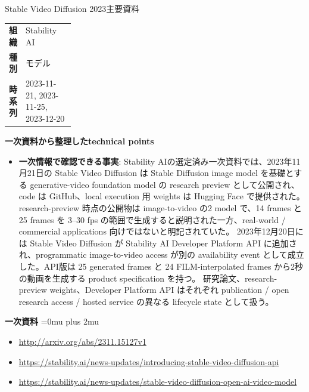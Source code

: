 \begin{technicalnote}{Stable Video Diffusion 2023}{主要資料}
\begingroup
\begin{tabularx}{\linewidth}{@{}>{\bfseries}p{0.22\linewidth}X@{}}
組織 & Stability AI \\
種別 & モデル \\
時系列 & 2023-11-21, 2023-11-25, 2023-12-20 \\
\end{tabularx}
\smallskip
{\bfseries 一次資料から整理したtechnical points}
\begin{itemize}[leftmargin=1.5em,itemsep=0.35em]
\item \textbf{一次情報で確認できる事実}: Stability AIの選定済み一次資料では、2023年11月21日の Stable Video Diffusion は Stable Diffusion image model を基礎とする generative-video foundation model の research preview として公開され、code は GitHub、local execution 用 weights は Hugging Face で提供された。 research-preview 時点の公開物は image-to-video の2 model で、14 frames と 25 frames を 3--30 fps の範囲で生成すると説明された一方、real-world / commercial applications 向けではないと明記されていた。 2023年12月20日には Stable Video Diffusion が Stability AI Developer Platform API に追加され、programmatic image-to-video access が別の availability event として成立した。API版は 25 generated frames と 24 FILM-interpolated frames から2秒の動画を生成する product specification を持つ。 研究論文、research-preview weights、Developer Platform API はそれぞれ publication / open research access / hosted service の異なる lifecycle state として扱う。
\end{itemize}
\begin{minipage}{\linewidth}
\begin{samepage}
{\bfseries 一次資料}
\begingroup\sloppy
\Urlmuskip=0mu plus 2mu\relax
\begin{itemize}[leftmargin=1.5em,itemsep=0.25em]
\item {\scriptsize\url{http://arxiv.org/abs/2311.15127v1}}
\item {\scriptsize\url{https://stability.ai/news-updates/introducing-stable-video-diffusion-api}}
\item {\scriptsize\url{https://stability.ai/news-updates/stable-video-diffusion-open-ai-video-model}}
\end{itemize}
\endgroup
\end{samepage}
\end{minipage}
\endgroup
\end{technicalnote}
\medskip


